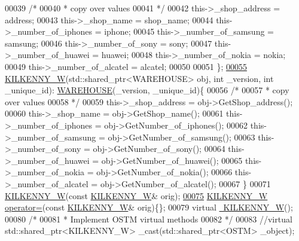 \begin{DoxyCode}
00039         \textcolor{comment}{/*}
00040 \textcolor{comment}{         * copy over values}
00041 \textcolor{comment}{         */}
00042         this->\_shop\_address = address;
00043         this->\_shop\_name = shop\_name;
00044         this->\_number\_of\_iphones = iphone;
00045         this->\_number\_of\_samsung = samsung;
00046         this->\_number\_of\_sony = sony;
00047         this->\_number\_of\_huawei = huawei;
00048         this->\_number\_of\_nokia = nokia;
00049         this->\_number\_of\_alcatel = alcatel;
00050         
00051     \};
\hypertarget{_k_i_l_k_e_n_n_y___w_8h_source.tex_l00055}{}\hyperlink{class_k_i_l_k_e_n_n_y___w_a6df9a34ae732b0196391aceecf865089}{00055}     \hyperlink{class_k_i_l_k_e_n_n_y___w_a6df9a34ae732b0196391aceecf865089}{KILKENNY\_W}(std::shared\_ptr<WAREHOUSE> obj, \textcolor{keywordtype}{int} \_version, \textcolor{keywordtype}{int} \_unique\_id): 
      \hyperlink{class_w_a_r_e_h_o_u_s_e}{WAREHOUSE}(\_version, \_unique\_id)\{
00056         \textcolor{comment}{/*}
00057 \textcolor{comment}{         * copy over values}
00058 \textcolor{comment}{         */}
00059         this->\_shop\_address = obj->GetShop\_address();
00060         this->\_shop\_name = obj->GetShop\_name();
00061         this->\_number\_of\_iphones = obj->GetNumber\_of\_iphones();
00062         this->\_number\_of\_samsung = obj->GetNumber\_of\_samsung();
00063         this->\_number\_of\_sony = obj->GetNumber\_of\_sony();
00064         this->\_number\_of\_huawei = obj->GetNumber\_of\_huawei();
00065         this->\_number\_of\_nokia = obj->GetNumber\_of\_nokia();
00066         this->\_number\_of\_alcatel = obj->GetNumber\_of\_alcatel();
00067     \}
00071     \hyperlink{class_k_i_l_k_e_n_n_y___w_aee4c4b30bc934ff827f0851077b7fbab}{KILKENNY\_W}(\textcolor{keyword}{const} \hyperlink{class_k_i_l_k_e_n_n_y___w}{KILKENNY\_W}& orig);
\hypertarget{_k_i_l_k_e_n_n_y___w_8h_source.tex_l00075}{}\hyperlink{class_k_i_l_k_e_n_n_y___w_acff3cfb6cc15b4c4bc0dbe5685406393}{00075}     \hyperlink{class_k_i_l_k_e_n_n_y___w}{KILKENNY\_W} \hyperlink{class_k_i_l_k_e_n_n_y___w_acff3cfb6cc15b4c4bc0dbe5685406393}{operator=}(\textcolor{keyword}{const} \hyperlink{class_k_i_l_k_e_n_n_y___w}{KILKENNY\_W}& orig)\{\};
00079     \textcolor{keyword}{virtual} \hyperlink{class_k_i_l_k_e_n_n_y___w_a5b3f84f505c05449d9a7235f25ff3694}{~KILKENNY\_W}();
00080     \textcolor{comment}{/*}
00081 \textcolor{comment}{     * Implement OSTM virtual methods}
00082 \textcolor{comment}{     */}
00083     \textcolor{comment}{//virtual std::shared\_ptr<KILKENNY\_W> \_cast(std::shared\_ptr<OSTM> \_object);}

\end{DoxyCode}
